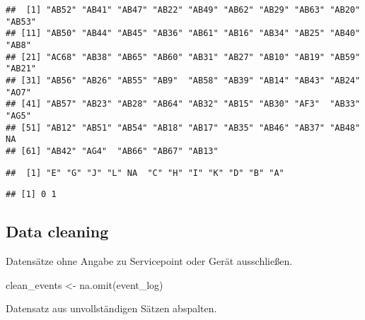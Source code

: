 \documentclass[
]{article}
\newenvironment{Shaded}{\begin{snugshade}}{\end{snugshade}}
\newcommand{\FunctionTok}[1]{\textcolor[rgb]{0.00,0.00,0.00}{#1}}
\newcommand{\NormalTok}[1]{#1}
\newcommand{\OtherTok}[1]{\textcolor[rgb]{0.56,0.35,0.01}{#1}}
\newcommand{\SpecialCharTok}[1]{\textcolor[rgb]{0.00,0.00,0.00}{#1}}
\begin{document}
\begin{verbatim}
##  [1] "AB52" "AB41" "AB47" "AB22" "AB49" "AB62" "AB29" "AB63" "AB20" "AB53"
## [11] "AB50" "AB44" "AB45" "AB36" "AB61" "AB16" "AB34" "AB25" "AB40" "AB8" 
## [21] "AC68" "AB38" "AB65" "AB60" "AB31" "AB27" "AB10" "AB19" "AB59" "AB21"
## [31] "AB56" "AB26" "AB55" "AB9"  "AB58" "AB39" "AB14" "AB43" "AB24" "AO7" 
## [41] "AB57" "AB23" "AB28" "AB64" "AB32" "AB15" "AB30" "AF3"  "AB33" "AG5" 
## [51] "AB12" "AB51" "AB54" "AB18" "AB17" "AB35" "AB46" "AB37" "AB48" NA    
## [61] "AB42" "AG4"  "AB66" "AB67" "AB13"
\end{verbatim}

\begin{Shaded}
\end{Shaded}

\begin{verbatim}
##  [1] "E" "G" "J" "L" NA  "C" "H" "I" "K" "D" "B" "A"
\end{verbatim}

\begin{Shaded}
\end{Shaded}

\begin{verbatim}
## [1] 0 1
\end{verbatim}

\hypertarget{data-cleaning}{%
\subsection{Data cleaning}\label{data-cleaning}}

Datensätze ohne Angabe zu Servicepoint oder Gerät ausschließen.

\begin{Shaded}
\begin{Highlighting}[]
\NormalTok{clean\_events }\OtherTok{\textless{}{-}} \FunctionTok{na.omit}\NormalTok{(event\_log)}
\end{Highlighting}
\end{Shaded}

Datensatz aus unvollständigen Sätzen abspalten.
\end{document}
